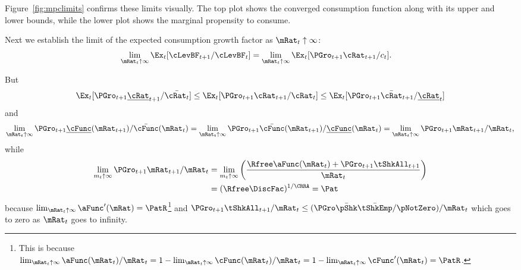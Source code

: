 \documentclass[BufferStockTheory]{subfiles}
\begin{document}
Figure~\ref{fig:mpclimits} confirms these limits visually.  The top
plot shows the converged consumption function along with its upper and lower bounds,
while the lower plot shows the marginal propensity to consume.
\renewcommand{\figFile}{mpclimits}
\hypertarget{\figFile}{}


\renewcommand{\figFile}{cFuncBounds}
\hypertarget{\figFile}{}



Next we establish the limit of the expected consumption growth factor
as $\mRat_{t} \uparrow \infty$:
\begin{equation}\begin{gathered}\begin{aligned}
  \lim_{\mRat_{t} \uparrow \infty} \Ex_{t}[
  \cLevBF_{t+1}/\cLevBF_{t}]  & = \lim_{\mRat_{t} \uparrow \infty} \Ex_{t}[
                                {\PGro}_{t+1} {\cRat}_{t+1}/c_{t}]. \notag
\end{aligned}\end{gathered}\end{equation}

But
\begin{align*}
  \Ex_{t}[{\PGro}_{t+1} {\underline{\cRat}}_{t+1}/\bar{\cRat_{t}}] \leq \Ex_{t}[{\PGro}_{t+1} {\cRat}_{t+1}/\cRat_{t}] \leq \Ex_{t}[{\PGro}_{t+1} {\bar{\cRat}}_{t+1}/\underline{\cRat}_{t}]
\end{align*}
and
\begin{equation}  \label{eq:xttoinfty}
  \lim_{\mRat_t \uparrow \infty} \PGro_{t+1}\underline{\cFunc}(\mRat_{t+1})/\bar{\cFunc}(\mRat_t) =
  \lim_{\mRat_{t} \uparrow \infty} \PGro_{t+1}\bar{\cFunc}(\mRat_{t+1})/\underline{\cFunc}(\mRat_t) =
  \lim_{\mRat_{t} \uparrow \infty}\PGro_{t+1} \mRat_{t+1}/\mRat_t,  \notag
\end{equation}
while \hypertarget{xtp1toinfty}{}
\begin{equation}\begin{gathered}\begin{aligned}  \label{eq:xtp1toinfty}
  \lim_{m_{t} \uparrow \infty} \PGro_{t+1} \mRat_{t+1}/\mRat_t  & = \lim_{m_{t} \uparrow \infty}
                                                                  \left(\frac{\Rfree \aFunc(\mRat_t)+{\PGro}_{t+1}\tShkAll_{t+1}}{\mRat_t}\right)
  \\  & = (\Rfree \DiscFac)^{1/\CRRA} = \Pat
\end{aligned}\end{gathered}\end{equation}
because $\lim_{\mRat_{t}\uparrow \infty} \aFunc^{\prime}(\mRat)=\PatR$\footnote{This is because $\lim_{\mRat_{t}\uparrow \infty} \aFunc(\mRat_{t})/\mRat_{t}=1-\lim_{\mRat_{t}\uparrow \infty} \cFunc(\mRat_{t})/\mRat_{t}=1-\lim_{\mRat_{t}\uparrow \infty}\cFunc^{\prime}(\mRat_{t})=\PatR$.} and
$\PGro_{t+1}\tShkAll_{t+1}/\mRat_{t} \leq (\PGro \bar{\pShk} \bar{\tShkEmp}/\pNotZero )/\mRat_{t}$ which
goes to zero as $\mRat_{t}$ goes to infinity.
\end{document}
